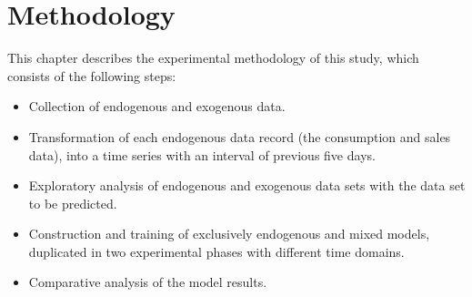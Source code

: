 
\chapter{Methodology} \label{cap:metodos}





 
 
 
 
 
 
   This chapter describes the experimental methodology of this study, which consists of the following steps:
    \begin{itemize}
        \item Collection of endogenous and exogenous data.
        \item Transformation of each endogenous data record (the consumption and sales data), into a time series with an interval of previous five days.
        \item Exploratory analysis of endogenous and exogenous data sets with the data set to be predicted.
        \item Construction and training of exclusively endogenous and mixed models, duplicated in two experimental phases with different time domains.
        \item Comparative analysis of the model results.
    \end{itemize}
    
